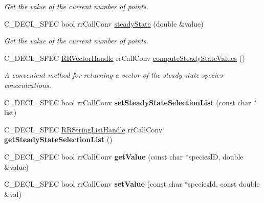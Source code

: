 \begin{DoxyCompactItemize}
\begin{DoxyCompactList}\small\item\em \-Get the value of the current number of points. \end{DoxyCompactList}\item 
\-C\-\_\-\-D\-E\-C\-L\-\_\-\-S\-P\-E\-C bool rr\-Call\-Conv \hyperlink{group__loadsave_ga0edd5f5a66884e0767d855d639cb45c0}{steady\-State} (double \&value)
\begin{DoxyCompactList}\small\item\em \-Get the value of the current number of points. \end{DoxyCompactList}\item 
\-C\-\_\-\-D\-E\-C\-L\-\_\-\-S\-P\-E\-C \hyperlink{rr__c__types_8h_aea46a16752b0ae2cd95c009030ee630e}{\-R\-R\-Vector\-Handle} \*
rr\-Call\-Conv \hyperlink{group__loadsave_ga95269e5d546721d19139d746d5ac8358}{compute\-Steady\-State\-Values} ()
\begin{DoxyCompactList}\small\item\em \-A convenient method for returning a vector of the steady state species concentrations. \end{DoxyCompactList}\item 
\hypertarget{group__loadsave_ga397a988c31c2010d9f2752080afa8dad}{
\-C\-\_\-\-D\-E\-C\-L\-\_\-\-S\-P\-E\-C bool rr\-Call\-Conv {\bfseries set\-Steady\-State\-Selection\-List} (const char $\ast$list)}
\label{group__loadsave_ga397a988c31c2010d9f2752080afa8dad}

\item 
\hypertarget{group__loadsave_ga29b3868509ef2c09e4bbf0b11b731443}{
\-C\-\_\-\-D\-E\-C\-L\-\_\-\-S\-P\-E\-C \hyperlink{rr__c__types_8h_abf561b014879247b7b92ee99c205de21}{\-R\-R\-String\-List\-Handle} \*
rr\-Call\-Conv {\bfseries get\-Steady\-State\-Selection\-List} ()}
\label{group__loadsave_ga29b3868509ef2c09e4bbf0b11b731443}

\item 
\hypertarget{group__loadsave_ga8c67bc930b33926bccb3c9f810dc2825}{
\-C\-\_\-\-D\-E\-C\-L\-\_\-\-S\-P\-E\-C bool rr\-Call\-Conv {\bfseries get\-Value} (const char $\ast$species\-I\-D, double \&value)}
\label{group__loadsave_ga8c67bc930b33926bccb3c9f810dc2825}

\item 
\hypertarget{group__loadsave_ga8663bcca2b00ef20c13841ca9fc9f56c}{
\-C\-\_\-\-D\-E\-C\-L\-\_\-\-S\-P\-E\-C bool rr\-Call\-Conv {\bfseries set\-Value} (const char $\ast$species\-Id, const double \&val)}
\label{group__loadsave_ga8663bcca2b00ef20c13841ca9fc9f56c}


\end{DoxyCompactItemize}
